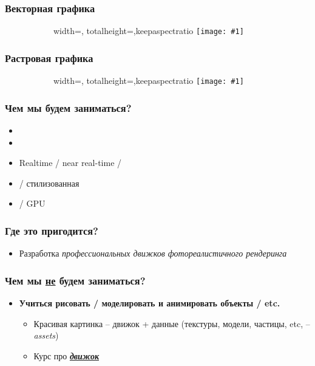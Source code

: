 \documentclass[10pt,handout]{beamer}
\newcommand{\slideimage}[1]{
  \begin{figure}
    \begin{adjustbox}{width=\textwidth, totalheight=\textheight-2\baselineskip-2\baselineskip,keepaspectratio}
      \texttt{[image: \#1]}
    \end{adjustbox}
  \end{figure}
}
\begin{document}

\begin{frame}
\frametitle{Векторная графика}
\begin{figure}
\slideimage{vector.jpg}
\end{figure}
\end{frame}

\begin{frame}
\frametitle{Растровая графика}
\begin{figure}
\slideimage{raster.png}
\end{figure}
\end{frame}


\begin{frame}
\frametitle{Чем мы будем заниматься?}
\begin{itemize}
\item {}
\item {}
\item Realtime / near real-time / 
\item {} / стилизованная
\item {} / GPU
\end{itemize}
\end{frame}

\begin{frame}
\frametitle{Где это пригодится?}
\begin{itemize}
\pause
\item Разработка \textit{профессиональных движков фотореалистичного рендеринга}
\end{itemize}
\end{frame}

\begin{frame}
\frametitle{Чем мы \underline{не} будем заниматься?}
\begin{itemize}
\pause
\item \textbf{Учиться рисовать / моделировать и анимировать объекты / etc.}
\pause
\begin{itemize}
\item Красивая картинка -- движок + данные (текстуры, модели, частицы, etc, -- \textit{assets})
\item Курс про \alert{\textbf{\underline{\textit{движок}}}}
\end{itemize}
\end{itemize}
\end{frame}
\end{document}
